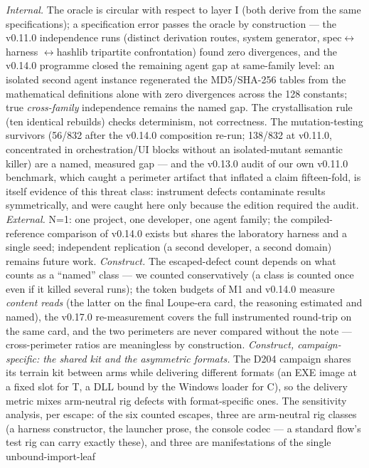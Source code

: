 \documentclass[10pt,a4paper]{article}
\begin{document}
\emph{Internal.} The oracle is circular with respect to layer I
(both derive from the same specifications); a specification error passes
the oracle by construction --- the v0.11.0 independence runs (distinct
derivation routes, system generator, spec$\leftrightarrow$\allowbreak harness
$\leftrightarrow$\allowbreak hashlib tripartite confrontation) found zero
divergences, and the v0.14.0 programme closed the remaining agent gap
at same-family level: an isolated second agent instance regenerated the
MD5/SHA-256 tables from the mathematical definitions alone with zero
divergences across the 128 constants; true \emph{cross-family}
independence remains the named gap. The crystallisation rule (ten
identical rebuilds) checks
determinism, not correctness. The mutation-testing survivors (56/832
after the v0.14.0 composition re-run; 138/832 at v0.11.0,
concentrated in orchestration/UI blocks without an isolated-mutant
semantic killer) are a named, measured gap --- and the v0.13.0 audit of
our own v0.11.0 benchmark, which caught a perimeter artifact that
inflated a claim fifteen-fold, is itself evidence of this threat class:
instrument defects contaminate results symmetrically, and were caught
here only because the edition required the audit. \emph{External.} N=1: one
project, one developer, one agent family; the compiled-reference
comparison of v0.14.0 exists but shares the laboratory harness and a
single seed; independent replication (a second developer, a second
domain) remains future work. \emph{Construct.} The
escaped-defect count depends on what counts as a ``named'' class --- we
counted conservatively (a class is counted once even if it killed several
runs); the token budgets of M1 and v0.14.0 measure \emph{content reads}
(the latter on the final Loupe-era card, the reasoning estimated and
named), the v0.17.0 re-measurement covers the full instrumented
round-trip on the same card, and the two perimeters are never compared
without the note --- cross-perimeter ratios are meaningless by
construction.
\emph{Construct, campaign-specific: the shared kit and the asymmetric
formats.} The D204 campaign shares its terrain kit between arms while
delivering different formats (an EXE image at a fixed slot for T, a DLL
bound by the Windows loader for C), so the delivery metric mixes
arm-neutral rig defects with format-specific ones. The sensitivity
analysis, per escape: of the six counted escapes, three are
arm-neutral rig classes (a harness constructor, the launcher prose,
the console codec --- a standard flow's test rig can carry exactly
these), and three are manifestations of the single unbound-import-leaf
\end{document}
